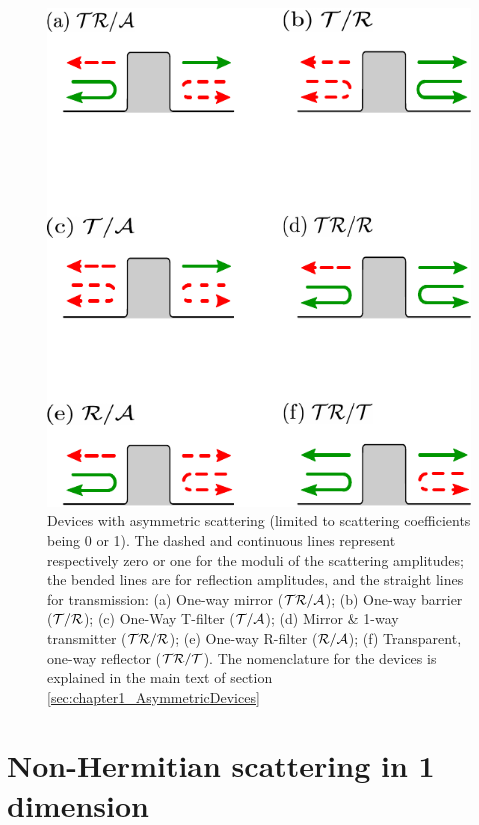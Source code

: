 \begin{figure}
  \center
  \includegraphics[width = 0.5\linewidth]{Figures/PotentialCasesPT.pdf}
  \caption{Devices with asymmetric scattering (limited to scattering coefficients being 0 or 1).  The dashed and continuous lines represent respectively zero or one
  for the moduli of the scattering amplitudes; the bended lines are for reflection amplitudes, and the straight lines for transmission:
  (a) One-way mirror ($\cal{TR/A}$); (b) One-way barrier ($\cal{T/R}$); (c) One-Way T-filter ($\cal{T/A}$);
  (d) Mirror \& 1-way transmitter ($\cal{TR/R}$); (e) One-way R-filter ($\cal{R/A}$); (f) Transparent, one-way
  reflector ($\cal{TR/T}$). The nomenclature for the devices is explained in the main text of section \ref{sec:chapter1_AsymmetricDevices}
  \label{fig:chapter1_cases}}
\end{figure}

\section{Non-Hermitian scattering in 1 dimension \label{sec:chapter1_ScattFormalism}}

